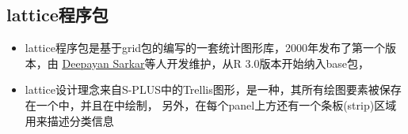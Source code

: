 \subsection{lattice程序包}
\begin{frame}[t,fragile]{\subsecname}{}
\begin{itemize}
\item lattice程序包是基于grid包的编写的一套统计图形库，2000年发布了第一个版本，由
\href{https://www.isid.ac.in/~deepayan/}{\uline{Deepayan Sarkar}}等人开发维护，从R 3.0版本开始纳入base包，
\item lattice设计理念来自S-PLUS中的Trellis图形，是一种，其所有绘图要素被保存在一个中，并且在中绘制，
另外，在每个panel上方还有一个条板(strip)区域用来描述分类信息
\end{itemize}

\vspace{-8pt}
\begin{overlayarea}{\textwidth}{\textheight}

\end{overlayarea}  
\end{frame} 

